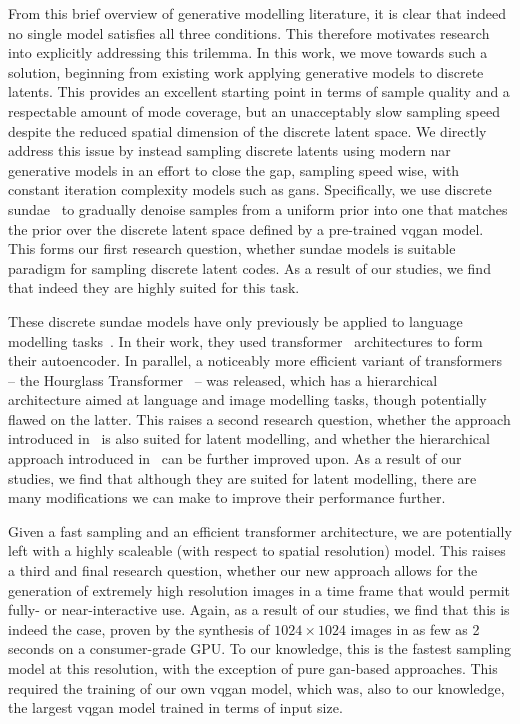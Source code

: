 From this brief overview of generative modelling literature, it is clear that
indeed no single model satisfies all three conditions. This therefore motivates
research into explicitly addressing this trilemma. In this work, we move towards
such a solution, beginning from existing work applying generative models to
discrete latents. This provides an excellent starting point in terms of sample
quality and a respectable amount of mode coverage, but an unacceptably slow
sampling speed despite the reduced spatial dimension of the discrete latent
space. We directly address this issue by instead sampling discrete latents using
modern \gls{nar} generative models in an effort to close the gap, sampling speed
wise, with constant iteration complexity models such as \glspl{gan}.
Specifically, we use discrete \gls{sundae}~\cite{savinov2022stepunrolled} to
gradually denoise samples from a uniform prior into one that matches the prior
over the discrete latent space defined by a pre-trained \gls{vqgan} model. This
forms our first research question, whether \gls{sundae} models is suitable
paradigm for sampling discrete latent codes. As a result of our studies, we find
that indeed they are highly suited for this task.

These discrete \gls{sundae} models have only previously be applied to
language modelling tasks~\cite{savinov2022stepunrolled}. In their work, they
used transformer~\cite{vaswani2017attention} architectures to form their
autoencoder. In parallel, a noticeably more efficient variant of transformers --
the Hourglass Transformer~\cite{nawrot2021hierarchical} -- was released, which
has a hierarchical architecture aimed at language and image modelling tasks,
though potentially flawed on the latter. This raises a second research question,
whether the approach introduced in~\citet{savinov2022stepunrolled} is also
suited for latent modelling, and whether the hierarchical approach introduced
in~\citet{nawrot2021hierarchical} can be further improved upon. As a result of
our studies, we find that although they are suited for latent modelling, there
are many modifications we can make to improve their performance further.

Given a fast sampling and an efficient transformer architecture, we are
potentially left with a highly scaleable (with respect to spatial resolution)
model. This raises a third and final research question, whether our new approach
allows for the generation of extremely high resolution images in a time frame
that would permit fully- or near-interactive use. Again, as a result of our
studies, we find that this is indeed the case, proven by the synthesis of $1024
\times 1024$ images in as few as 2 seconds on a consumer-grade GPU. To our
knowledge, this is the fastest sampling model at this resolution, with the
exception of pure \gls{gan}-based approaches. This required the training of our
own \gls{vqgan} model, which was, also to our knowledge, the largest \gls{vqgan} model
trained in terms of input size.

